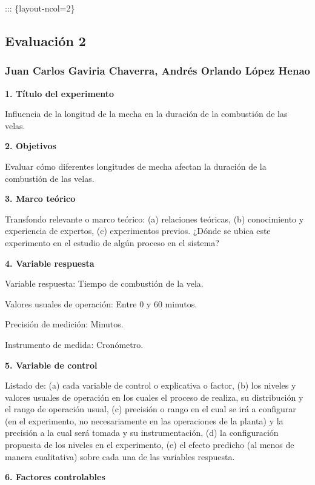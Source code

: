 \documentclass[
  letterpaper,
  DIV=11,
  numbers=noendperiod]{scrartcl}
\author{}
\date{}
\renewcommand*\contentsname{Table of contents}
\newcommand\contentsname{Table of contents}
\begin{document}
\renewcommand*\contentsname{Table of contents}
{
\hypersetup{linkcolor=}
\setcounter{tocdepth}{3}
\tableofcontents
}
::: \{layout-ncol=2\}

\subsection{Evaluación 2}\label{evaluaciuxf3n-2}

\subsubsection{Juan Carlos Gaviria Chaverra, Andrés Orlando López
Henao}\label{juan-carlos-gaviria-chaverra-andruxe9s-orlando-luxf3pez-henao}

\textbf{1. Título del experimento}

Influencia de la longitud de la mecha en la duración de la combustión de
las velas.

\textbf{2. Objetivos}

Evaluar cómo diferentes longitudes de mecha afectan la duración de la
combustión de las velas.

\textbf{3. Marco teórico}

Transfondo relevante o marco teórico: (a) relaciones teóricas, (b)
conocimiento y experiencia de expertos, (c) experimentos previos. ¿Dónde
se ubica este experimento en el estudio de algún proceso en el sistema?

\textbf{4. Variable respuesta}

Variable respuesta: Tiempo de combustión de la vela.

Valores usuales de operación: Entre 0 y 60 minutos.

Precisión de medición: Minutos.

Instrumento de medida: Cronómetro.

\textbf{5. Variable de control}

Listado de: (a) cada variable de control o explicativa o factor, (b) los
niveles y valores usuales de operación en los cuales el proceso de
realiza, su distribución y el rango de operación usual, (c) precisión o
rango en el cual se irá a configurar (en el experimento, no
necesariamente en las operaciones de la planta) y la precisión a la cual
será tomada y su instrumentación, (d) la configuración propuesta de los
niveles en el experimento, (e) el efecto predicho (al menos de manera
cualitativa) sobre cada una de las variables respuesta.

\textbf{6. Factores controlables}
\end{document}
